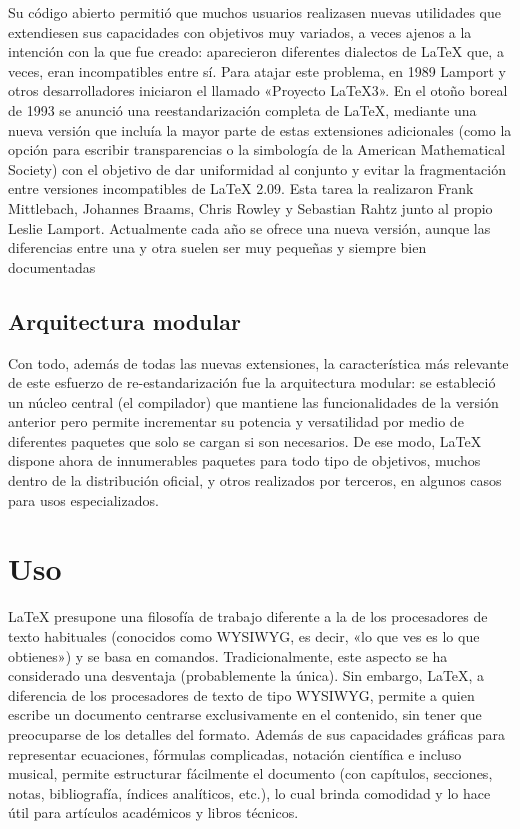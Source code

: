 \documentclass{article}
\begin{document}
    Su código abierto permitió que muchos usuarios realizasen nuevas utilidades que extendiesen sus capacidades con objetivos muy variados, a veces ajenos a la intención con la que fue creado: aparecieron diferentes dialectos de LaTeX que, a veces, eran incompatibles entre sí. Para atajar este problema, en 1989 Lamport y otros desarrolladores iniciaron el llamado «Proyecto LaTeX3». En el otoño boreal de 1993 se anunció una reestandarización completa de LaTeX, mediante una nueva versión que incluía la mayor parte de estas extensiones adicionales (como la opción para escribir transparencias o la simbología de la American Mathematical Society) con el objetivo de dar uniformidad al conjunto y evitar la fragmentación entre versiones incompatibles de LaTeX 2.09. Esta tarea la realizaron Frank Mittlebach, Johannes Braams, Chris Rowley y Sebastian Rahtz junto al propio Leslie Lamport. Actualmente cada año se ofrece una nueva versión, aunque las diferencias entre una y otra suelen ser muy pequeñas y siempre bien documentadas
    
    \subsection{Arquitectura modular}
    
    Con todo, además de todas las nuevas extensiones, la característica más relevante de este esfuerzo de re-estandarización fue la arquitectura modular: se estableció un núcleo central (el compilador) que mantiene las funcionalidades de la versión anterior pero permite incrementar su potencia y versatilidad por medio de diferentes paquetes que solo se cargan si son necesarios. De ese modo, LaTeX dispone ahora de innumerables paquetes para todo tipo de objetivos, muchos dentro de la distribución oficial, y otros realizados por terceros, en algunos casos para usos especializados.
    
 \section{Uso}
 
 LaTeX presupone una filosofía de trabajo diferente a la de los procesadores de texto habituales (conocidos como WYSIWYG, es decir, «lo que ves es lo que obtienes») y se basa en comandos. Tradicionalmente, este aspecto se ha considerado una desventaja (probablemente la única). Sin embargo, LaTeX, a diferencia de los procesadores de texto de tipo WYSIWYG, permite a quien escribe un documento centrarse exclusivamente en el contenido, sin tener que preocuparse de los detalles del formato. Además de sus capacidades gráficas para representar ecuaciones, fórmulas complicadas, notación científica e incluso musical, permite estructurar fácilmente el documento (con capítulos, secciones, notas, bibliografía, índices analíticos, etc.), lo cual brinda comodidad y lo hace útil para artículos académicos y libros técnicos.
 
\end{document}
